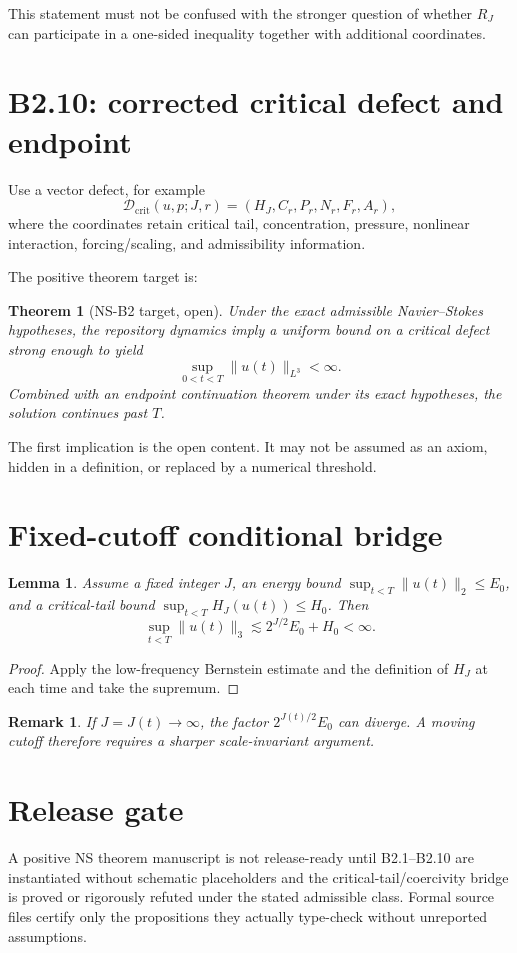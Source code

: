\documentclass[11pt]{article}
\newtheorem{theorem}{Theorem}
\newtheorem{lemma}{Lemma}
\newtheorem{remark}{Remark}
\begin{document}
This statement must not be confused with the stronger question of whether $R_J$ can participate in a one-sided inequality together with additional coordinates.

\section{B2.10: corrected critical defect and endpoint}
Use a vector defect, for example
\[
\mathcal D_{\mathrm{crit}}(u,p;J,r)
=(H_J,C_r,P_r,N_r,F_r,A_r),
\]
where the coordinates retain critical tail, concentration, pressure, nonlinear interaction, forcing/scaling, and admissibility information.

The positive theorem target is:
\begin{theorem}[NS-B2 target, open]
Under the exact admissible Navier--Stokes hypotheses, the repository dynamics imply a uniform bound on a critical defect strong enough to yield
\[
\sup_{0<t<T}\|u(t)\|_{L^3}<\infty.
\]
Combined with an endpoint continuation theorem under its exact hypotheses, the solution continues past $T$.
\end{theorem}

The first implication is the open content. It may not be assumed as an axiom, hidden in a definition, or replaced by a numerical threshold.

\section{Fixed-cutoff conditional bridge}
\begin{lemma}
Assume a fixed integer $J$, an energy bound $\sup_{t<T}\|u(t)\|_2\le E_0$, and a critical-tail bound $\sup_{t<T}H_J(u(t))\le H_0$. Then
\[
\sup_{t<T}\|u(t)\|_3
\lesssim2^{J/2}E_0+H_0<\infty.
\]
\end{lemma}
\begin{proof}
Apply the low-frequency Bernstein estimate and the definition of $H_J$ at each time and take the supremum.
\end{proof}

\begin{remark}
If $J=J(t)\to\infty$, the factor $2^{J(t)/2}E_0$ can diverge. A moving cutoff therefore requires a sharper scale-invariant argument.
\end{remark}

\section{Release gate}
A positive NS theorem manuscript is not release-ready until B2.1--B2.10 are instantiated without schematic placeholders and the critical-tail/coercivity bridge is proved or rigorously refuted under the stated admissible class. Formal source files certify only the propositions they actually type-check without unreported assumptions.
\end{document}
